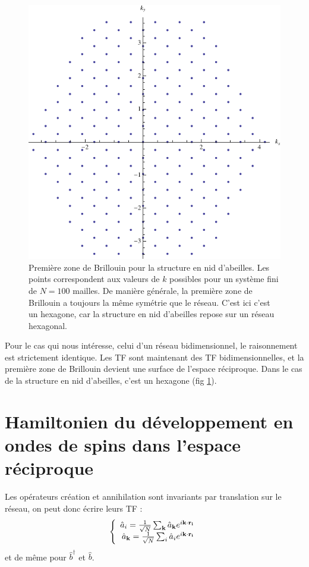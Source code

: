 \documentclass[a4paper, french]{report}
\newcommand{\an}{\hat{a}}
\newcommand{\blbl}{création et annihilation }
\newcommand{\ban}{\hat{b}}
\newcommand{\bcre}{\hat{b}^\dagger}
\newcommand{\pos}[1]{\ensuremath{\mathbf{r_{#1}}}\xspace}
\newcommand{\ond}{\ensuremath{\mathbf{k}\xspace}}
\newcommand{\1}{\ensuremath{\ket{\om_1\bom_1}}\xspace}
\newcommand{\2}{\ensuremath{\ket{\om_2\bom_2}}\xspace}
\begin{document}
\begin{figure}[htp]
\centering
\includegraphics[scale=1]{vector_img/zone_brill.pdf}
\caption{Première zone de Brillouin pour la structure en nid d'abeilles. Les points correspondent aux valeurs de $k$ possibles pour un système fini de $N=100$ mailles. De manière générale, la première zone de Brillouin a toujours la même symétrie que le réseau. C'est ici c'est un hexagone, car la structure en nid d'abeilles repose sur un réseau hexagonal.}
\label{fig:zonebrill}
\end{figure}

Pour le cas qui nous intéresse, celui d'un réseau bidimensionnel, le raisonnement est strictement identique. Les TF sont maintenant des TF bidimensionnelles, et la première zone de Brillouin devient une surface de l'espace réciproque. Dans le cas de la structure en nid d'abeilles, c'est un hexagone (fig \ref{fig:zonebrill}).
\section{Hamiltonien du développement en ondes de spins dans l'espace réciproque}
Les opérateurs \blbl sont invariants par translation sur le réseau, on peut donc écrire leurs TF :
\begin{equation}
\left\{
	\begin{array}{r c l}
		\an_i=\frac{1}{\sqrt{N}}\sum_{\ond}\an_{\ond}e^{i\ond\cdot\pos{i}}\\
		\an_{\ond}=\frac{1}{\sqrt{N}}\sum_i\an_ie^{i\ond\cdot\pos{i}}
	\end{array}
\right.
\end{equation}
et de même pour $\bcre$ et $\ban$.
\end{document}
